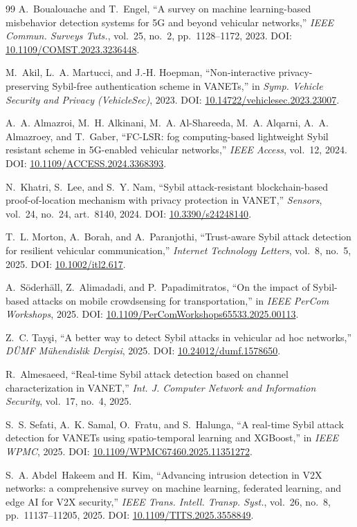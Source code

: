 \begin{thebibliography}{99}
 A.~Boualouache and T.~Engel, ``A survey on machine learning-based misbehavior detection systems for 5G and beyond vehicular networks,'' \emph{IEEE Commun. Surveys Tuts.}, vol.~25, no.~2, pp.~1128--1172, 2023. DOI: \url{10.1109/COMST.2023.3236448}.

 M.~Akil, L.~A. Martucci, and J.-H. Hoepman, ``Non-interactive privacy-preserving Sybil-free authentication scheme in VANETs,'' in \emph{Symp. Vehicle Security and Privacy (VehicleSec)}, 2023. DOI: \url{10.14722/vehiclesec.2023.23007}.

 A.~A. Almazroi, M.~H. Alkinani, M.~A. Al-Shareeda, M.~A. Alqarni, A.~A. Almazroey, and T.~Gaber, ``FC-LSR: fog computing-based lightweight Sybil resistant scheme in 5G-enabled vehicular networks,'' \emph{IEEE Access}, vol.~12, 2024. DOI: \url{10.1109/ACCESS.2024.3368393}.

 N.~Khatri, S.~Lee, and S.~Y. Nam, ``Sybil attack-resistant blockchain-based proof-of-location mechanism with privacy protection in VANET,'' \emph{Sensors}, vol.~24, no.~24, art.~8140, 2024. DOI: \url{10.3390/s24248140}.

 T.~L. Morton, A.~Borah, and A.~Paranjothi, ``Trust-aware Sybil attack detection for resilient vehicular communication,'' \emph{Internet Technology Letters}, vol.~8, no.~5, 2025. DOI: \url{10.1002/itl2.617}.

 A.~S\"oderh\"all, Z.~Alimadadi, and P.~Papadimitratos, ``On the impact of Sybil-based attacks on mobile crowdsensing for transportation,'' in \emph{IEEE PerCom Workshops}, 2025. DOI: \url{10.1109/PerComWorkshops65533.2025.00113}.

 Z.~C. Tay\c{s}i, ``A better way to detect Sybil attacks in vehicular ad hoc networks,'' \emph{D\"UMF M\"uhendislik Dergisi}, 2025. DOI: \url{10.24012/dumf.1578650}.

 R.~Almesaeed, ``Real-time Sybil attack detection based on channel characterization in VANET,'' \emph{Int. J. Computer Network and Information Security}, vol.~17, no.~4, 2025.

 S.~S. Sefati, A.~K. Samal, O.~Fratu, and S.~Halunga, ``A real-time Sybil attack detection for VANETs using spatio-temporal learning and XGBoost,'' in \emph{IEEE WPMC}, 2025. DOI: \url{10.1109/WPMC67460.2025.11351272}.

 S.~A. Abdel~Hakeem and H.~Kim, ``Advancing intrusion detection in V2X networks: a comprehensive survey on machine learning, federated learning, and edge AI for V2X security,'' \emph{IEEE Trans. Intell. Transp. Syst.}, vol.~26, no.~8, pp.~11137--11205, 2025. DOI: \url{10.1109/TITS.2025.3558849}.


\end{thebibliography}
